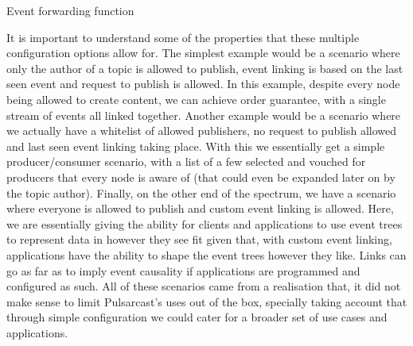\vspace{8pt}
\begin{algorithm}[H]
  \SetAlgoLined
  \caption{Event forwarding function}
	\label{alg:send-event}
\end{algorithm}
\vspace{8pt}

It is important to understand some of the properties that these multiple
configuration options allow for. The simplest example would be a scenario where
only the author of a topic is allowed to publish, event linking is based on the
last seen event and request to publish is allowed. In this example, despite
every node being allowed to create content, we can achieve order guarantee,
with a single stream of events all linked together. Another example would be a
scenario where we actually have a whitelist of allowed publishers, no request
to publish allowed and last seen event linking taking place. With this we
essentially get a simple producer/consumer scenario, with a list of a few
selected and vouched for producers that every node is aware of (that could even
be expanded later on by the topic author). Finally, on the other end of the
spectrum, we have a scenario where everyone is allowed to publish and custom
event linking is allowed. Here, we are essentially giving the ability for
clients and applications to use event trees to represent data in however they
see fit given that, with custom event linking, applications have the ability to
shape the event trees however they like. Links can go as far as to imply event
causality if applications are programmed and configured as such. All of these
scenarios came from a realisation that, it did not make sense to limit
Pulsarcast's uses out of the box, specially taking account that through simple
configuration we could cater for a broader set of use cases and applications.

